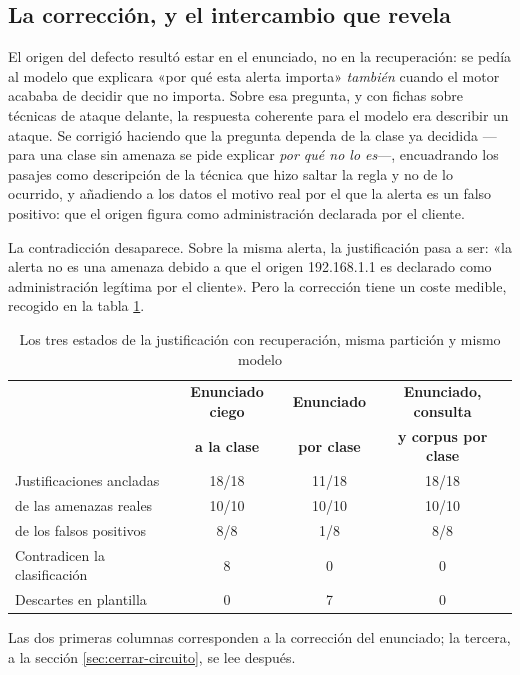 \subsection{La corrección, y el intercambio que revela}

El origen del defecto resultó estar en el enunciado, no en la recuperación: se pedía al modelo que
explicara «por qué esta alerta importa» \emph{también} cuando el motor acababa de decidir que no
importa. Sobre esa pregunta, y con fichas sobre técnicas de ataque delante, la respuesta coherente
para el modelo era describir un ataque. Se corrigió haciendo que la pregunta dependa de la clase ya
decidida ---para una clase sin amenaza se pide explicar \emph{por qué no lo es}---, encuadrando los
pasajes como descripción de la técnica que hizo saltar la regla y no de lo ocurrido, y añadiendo a
los datos el motivo real por el que la alerta es un falso positivo: que el origen figura como
administración declarada por el cliente.

La contradicción desaparece. Sobre la misma alerta, la justificación pasa a ser: «la alerta no es
una amenaza debido a que el origen 192.168.1.1 es declarado como administración legítima por el
cliente». Pero la corrección tiene un coste medible, recogido en la tabla \ref{tab:correccion}.

\begin{table}[H]
  \centering
  \caption{Los tres estados de la justificación con recuperación, misma partición y mismo modelo}
  \label{tab:correccion}
  \begin{tabular}{@{}p{}ccc@{}}
    \toprule
    & \textbf{Enunciado ciego} & \textbf{Enunciado} & \textbf{Enunciado, consulta} \\
    & \textbf{a la clase} & \textbf{por clase} & \textbf{y corpus por clase} \\
    \midrule
    Justificaciones ancladas & 18/18 & 11/18 & 18/18 \\
    \quad de las amenazas reales & 10/10 & 10/10 & 10/10 \\
    \quad de los falsos positivos & 8/8 & 1/8 & 8/8 \\
    Contradicen la clasificación & 8 & 0 & 0 \\
    Descartes en plantilla & 0 & 7 & 0 \\
    \bottomrule
  \end{tabular}
\end{table}

Las dos primeras columnas corresponden a la corrección del enunciado; la tercera, a la sección
\ref{sec:cerrar-circuito}, se lee después.

